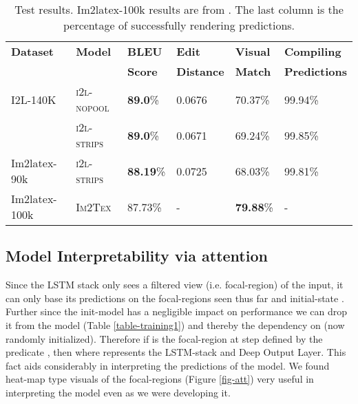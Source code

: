 \documentclass{article}
\begin{document}
\begin{table*}[!hbtp]
	\caption{Test results. Im2latex-100k results are from \citet{Deng2017ImagetoMarkupGW}. The last column is the percentage of successfully rendering predictions.}
	\begin{tabular}{llllll}
		\hline
		\textbf{Dataset} & \textbf{Model} & \textbf{BLEU}  & \textbf{Edit}     & \textbf{Visual} & \textbf{Compiling} \\
		&         & \textbf{Score} & \textbf{Distance} & \textbf{Match\footnotemark[103]} & \textbf{Predictions} \\
		\hline
		I2L-140K & \textsc{i2l-nopool} & \textbf{89.0}\% &  0.0676 & 70.37\% & 99.94\% \\
		& \textsc{i2l-strips} & \textbf{89.0}\% & 0.0671 & 69.24\%  & 99.85\% \\
		\hline
		Im2latex-90k & \textsc{i2l-strips} & \textbf{88.19}\%& 0.0725 & 68.03\%  & 99.81\% \\
		Im2latex-100k      & \textsc{Im2Tex}     & 87.73\%         & - & \textbf{79.88}\%  & - \\
		\hline
	\end{tabular}
	\centering
	\label{table-scores}
\end{table*}

\subsection{Model Interpretability via attention} Since the LSTM stack only sees a filtered view (i.e. focal-region) of the input, it can only base its predictions on the focal-regions seen thus far and initial-state . Further since the init-model has a negligible impact on performance we can drop it from the model (Table \ref{table-training1}) and thereby the dependency on  (now randomly initialized). Therefore if  is the focal-region at step  defined by the predicate , then  where  represents the LSTM-stack and Deep Output Layer. This fact aids considerably in interpreting the predictions of the model. We found heat-map type visuals of the focal-regions (Figure \ref{fig-att}) very useful in interpreting the model even as we were developing it.
\end{document}
